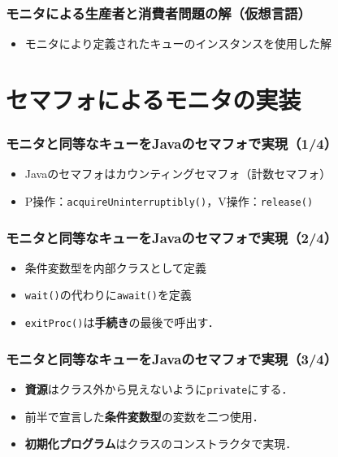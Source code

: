 \documentclass[dvipdfmx]{beamer}
\begin{document}
\begin{frame}
  \frametitle{モニタによる生産者と消費者問題の解（仮想言語）}
  

  \begin{itemize}
  \item モニタにより定義されたキューのインスタンスを使用した解
  \end{itemize}
\end{frame}

\section{セマフォによるモニタの実装}
\begin{frame}
  \frametitle{モニタと同等なキューをJavaのセマフォで実現（1/4）}
  

  \begin{itemize}
  \item Javaのセマフォはカウンティングセマフォ（計数セマフォ）
  \item P操作：{\tt acquireUninterruptibly()}，V操作：{\tt release()}
  \end{itemize}
\end{frame}

\begin{frame}
  \frametitle{モニタと同等なキューをJavaのセマフォで実現（2/4）}
  

  \begin{itemize}
  \item 条件変数型を内部クラスとして定義
  \item {\tt wait()}の代わりに{\tt await()}を定義
  \item {\tt exitProc()}は{\bf 手続き}の最後で呼出す．
  \end{itemize}
\end{frame}

\begin{frame}
  \frametitle{モニタと同等なキューをJavaのセマフォで実現（3/4）}
  

  \begin{itemize}
  \item {\bf 資源}はクラス外から見えないように{\tt private}にする．
  \item 前半で宣言した{\bf 条件変数型}の変数を二つ使用．
  \item {\bf 初期化プログラム}はクラスのコンストラクタで実現．
  \end{itemize}
\end{frame}
\end{document}
